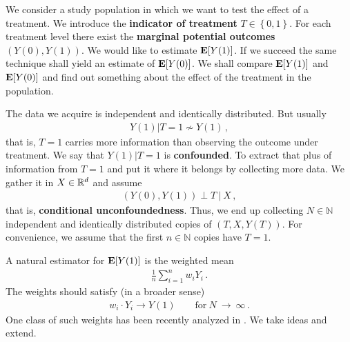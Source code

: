 We consider a study population in which we want to test the effect of a treatment.
We introduce the \textbf{indicator of treatment} $T\in \left\{ 0,1 \right\}$.
For each treatment level there exist the \textbf{marginal potential outcomes}
$(Y(0),Y(1))$. We would like to estimate $\mathbf{E}[Y(1)]$. If we succeed the same technique
shall yield an estimate of $\mathbf{E}[Y(0)]$. We shall compare $\mathbf{E}[Y(1)]$ and $\mathbf{E}[Y(0)]$ and 
find out something about the effect of the treatment in the population.

The data we acquire is independent and identically distributed. But usually
\begin{gather}
  Y(1)|T=1 \nsim Y(1) 
  \,,
\end{gather}
that is, $T=1$ carries more information than observing the outcome under treatment.
We say that $Y(1)|T=1$ is \textbf{confounded}. To extract that plus of information from $T=1$ and put it where it belongs by collecting more data.
We gather it in $X\in \mathbb{R}^d$ and assume
\begin{gather}
  (Y(0),Y(1))
  \perp
  T
  \ 
  |
  \ 
  X
  \,,
\end{gather}
that is, \textbf{conditional unconfoundedness}.
Thus, we end up collecting $N\in \mathbb{N}$ independent and identically distributed copies of 
$(T,X,Y(T))$. For convenience, we assume that the first $n\in \mathbb{N}$ copies have $T=1$.

A natural estimator for $\mathbf{E}[Y(1)]$ is the weighted mean
\begin{gather}
  \frac{1}{n}
  \sum_{i=1}^{n} 
  w_i Y_i
  \,.
\end{gather}
The weights should satisfy (in a broader sense)
\begin{gather}
  w_i\cdot Y_i \to Y(1)
  \qquad 
  \text{for}\ 
  N
  \ 
  \to
  \ 
  \infty
  \,.
\end{gather}
One class of such weights has been recently analyzed in \cite{Wang2019}.
We take ideas and extend.

